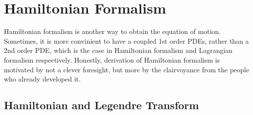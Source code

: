\section{Hamiltonian Formalism}
Hamiltonian formalism is another way to obtain the equation of motion.
Sometimes, it is more convinient to have a coupled 1st order PDEs, rather than a 2nd order PDE, which is the case in Hamiltonian formalism and Lagrangian formalism respectively.
Honestly, derivation of Hamiltonian formalism is motivated by not a clever foresight, but more by the clairvoyance from the people who already developed it.

\subsection{Hamiltonian and Legendre Transform}

